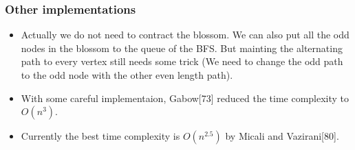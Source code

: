 \documentclass[hyperref={pdfpagelabels=false}]{beamer}
\begin{document}
\frame
{
	\frametitle{Other implementations}
	
	\begin{itemize}
		\item Actually we do not need to contract the blossom. We can also put all the odd nodes in the blossom to the queue of the BFS. But mainting the alternating path to every vertex still needs some trick (We need to change the odd path to the odd node with the other even length path).
		\item With some careful implementaion, Gabow[73] reduced the time complexity to $O(n^{3})$.
		\item Currently the best time complexity is $O(n^{2.5})$ by Micali and Vazirani[80].
	\end{itemize}
	
}

%			
%
%			
%
\end{document}
